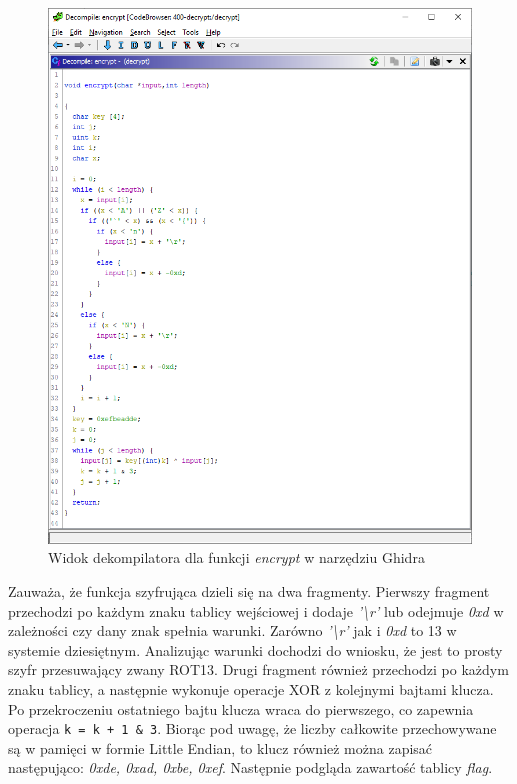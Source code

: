 \documentclass[language=polish,type=eng]{aghmodern}
\begin{document}
\begin{figure}[H]
\centering
\includegraphics[width=\textwidth]{400_encrypt}
\caption{Widok dekompilatora dla funkcji \emph{encrypt} w narzędziu Ghidra}
\end{figure}

Zauważa, że funkcja szyfrująca dzieli się na dwa fragmenty.
Pierwszy fragment przechodzi po każdym znaku tablicy wejściowej i dodaje
\emph{'\textbackslash r'} lub
odejmuje \emph{0xd} w zależności czy dany znak spełnia warunki.
Zarówno \emph{'\textbackslash r'} jak i \emph{0xd} to 13 w systemie dziesiętnym.
Analizując warunki dochodzi do wniosku, że jest to prosty szyfr przesuwający zwany ROT13.
Drugi fragment również przechodzi po każdym znaku tablicy, a następnie wykonuje
operacje XOR z kolejnymi bajtami klucza. Po przekroczeniu ostatniego bajtu klucza
wraca do pierwszego, co zapewnia operacja \texttt{k = k + 1 & 3}.
Biorąc pod uwagę, że liczby całkowite przechowywane
są w pamięci w formie Little Endian, to klucz również można zapisać następująco:
\emph{0xde, 0xad, 0xbe, 0xef}. Następnie podgląda zawartość tablicy \emph{flag}.
\end{document}
